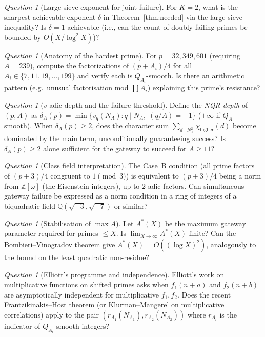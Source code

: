 \documentclass[12pt]{amsart}
\theoremstyle{definition}
\theoremstyle{remark}
\newtheorem{question}[theorem]{Question}
\begin{document}
\begin{question}[Large sieve exponent for joint failure]\label{q:largesieve}
For $K = 2$, what is the sharpest achievable exponent $\delta$
in Theorem~\ref{thm:needed} via the large sieve inequality?
Is $\delta = 1$ achievable (i.e., can the count of doubly-failing primes
be bounded by $O(X / \log^2 X)$)?
\end{question}

\begin{question}[Anatomy of the hardest prime]\label{q:anatomy}
For $p = 32{,}349{,}601$ (requiring $A = 239$),
compute the factorizations of $(p + A_i)/4$ for all $A_i \in \{7, 11, 19, \ldots, 199\}$
and verify each is $Q_{A_i}$-smooth.
Is there an arithmetic pattern (e.g.\ unusual factorisation mod $\prod A_i$)
explaining this prime's resistance?
\end{question}

\begin{question}[$v$-adic depth and the failure threshold]\label{q:padic}
Define the \emph{NQR depth} of $(p, A)$ as
$\delta_A(p) = \min\{v_q(N_A) : q \mid N_A,\; (q/A) = -1\}$
($+\infty$ if $Q_A$-smooth).
When $\delta_A(p) \ge 2$, does the character sum
$\sum_{d \mid N_A^2} \chi_{\text{higher}}(d)$ become dominated by the main term,
unconditionally guaranteeing success?
Is $\delta_A(p) \ge 2$ alone sufficient for the gateway to succeed for $A \ge 11$?
\end{question}

\begin{question}[Class field interpretation]\label{q:classfield}
The Case~B condition (all prime factors of $(p+3)/4$ congruent to $1 \pmod 3$)
is equivalent to $(p+3)/4$ being a norm from $\mathbb{Z}[\omega]$
(the Eisenstein integers), up to 2-adic factors.
Can simultaneous gateway failure be expressed as a norm condition
in a ring of integers of a biquadratic field
$\mathbb{Q}(\sqrt{-3}, \sqrt{-7})$ or similar?
\end{question}

\begin{question}[Stabilisation of $\max A$]\label{q:maxA}
Let $A^*(X)$ be the maximum gateway parameter required for primes $\le X$.
Is $\lim_{X \to \infty} A^*(X)$ finite?
Can the Bombieri--Vinogradov theorem give $A^*(X) = O((\log X)^2)$,
analogously to the bound on the least quadratic non-residue?
\end{question}

\begin{question}[Elliott's programme and independence]\label{q:multiplicative}
Elliott's work on multiplicative functions on shifted primes asks when
$f_1(n + a)$ and $f_2(n + b)$ are asymptotically independent
for multiplicative $f_1, f_2$.
Does the recent Frantzikinakis--Host theorem
(or Klurman--Mangerel on multiplicative correlations)
apply to the pair $(r_{A_1}(N_{A_1}), r_{A_2}(N_{A_2}))$
where $r_{A_i}$ is the indicator of $Q_{A_i}$-smooth integers?
\end{question}
\end{document}
